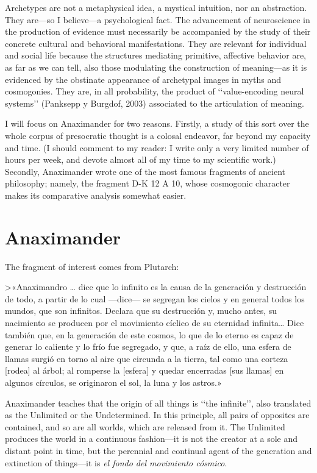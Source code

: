 \documentclass[a4paper]{article}
\begin{document}
Archetypes are not a metaphysical idea, a mystical intuition, nor an
abstraction. They are---so I believe---a psychological fact. The advancement of
neuroscience in the production of evidence must necessarily be accompanied by
the study of their concrete cultural and behavioral manifestations. They are
relevant for individual and social life because the structures mediating
primitive, affective behavior are, as far as we can tell, also those modulating
the construction of meaning---as it is evidenced by the obstinate appearance of
archetypal images in myths and cosmogonies. They are, in all probability, the
product of \lq\lq value-encoding neural systems\rq\rq{} (Panksepp y Burgdof,
2003) associated to the articulation of meaning.

I will focus on Anaximander for two reasons. Firstly, a study of this sort over
the whole corpus of presocratic thought is a colosal endeavor, far beyond my
capacity and time. (I should comment to my reader: I write only a very limited
number of hours per week, and devote almost all of my time to my scientific
work.) Secondly, Anaximander wrote one of the most famous fragments of
ancient philosophy; namely, the fragment D-K 12 A 10, whose cosmogonic character
makes its comparative analysis somewhat easier. 

\section{Anaximander}

The fragment of interest comes from Plutarch:

>«Anaximandro … dice que lo infinito es la causa de la generación y destrucción
de todo, a partir de lo cual —dice— se segregan los cielos y en general todos
los mundos, que son infinitos. Declara que su destrucción y, mucho antes, su
nacimiento se producen por el movimiento cíclico de su eternidad infinita… Dice
también que, en la generación de este cosmos, lo que de lo eterno es capaz de
generar lo caliente y lo frío fue segregado, y que, a raíz de ello, una esfera
de llamas surgió en torno al aire que circunda a la tierra, tal como una corteza
[rodea] al árbol; al romperse la [esfera] y quedar encerradas [sus llamas] en
algunos círculos, se originaron el sol, la luna y los astros.»

Anaximander teaches that the origin of all things is \lq\lq the
infinite\rq\rq{}, also translated as the Unlimited or the Undetermined. In this
principle, all pairs of opposites are contained, and so are all worlds, which
are released from it. The Unlimited produces the world in a continuous
fashion---it is not the creator at a sole and distant point in time, but the
perennial and continual agent of the generation and extinction of
things---it is \textit{el fondo del movimiento cósmico}. 
\end{document}
